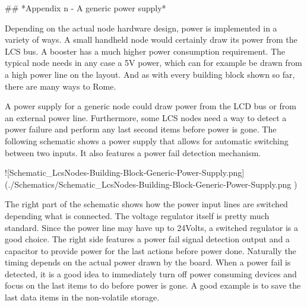 ## *Appendix n - A generic power supply*

Depending on the actual node hardware design, power is implemented in a variety of ways. A small handheld node would certainly draw its power from the LCS bus. A booster has a much higher power consumption requirement. The typical node needs in any case a 5V power, which can for example be drawn from a high power line on the layout. And as with every building block shown so far, there are many ways to Rome.

A power supply for a generic node could draw power from the LCD bus or from an external power line. Furthermore, some LCS nodes need a way to detect a power failure and perform any last second items before power is gone. The following schematic shows a power supply that allows for automatic switching between two inputs. It also features a power fail detection mechanism.


![Schematic_LcsNodes-Building-Block-Generic-Power-Supply.png](./Schematics/Schematic_LcsNodes-Building-Block-Generic-Power-Supply.png )

The right part of the schematic shows how the power input lines are switched depending what is connected. The voltage regulator itself is pretty much standard. Since the power line may have up to 24Volts, a switched regulator is a good choice. The right side features a power fail signal detection output and a capacitor to provide power for the last actions before power done. Naturally the timing depends on the actual power drawn by the board. When a power fail is detected, it is a good idea to immediately turn off power consuming devices and focus on the last items to do before power is gone. A good example is to save the last data items in the non-volatile storage.